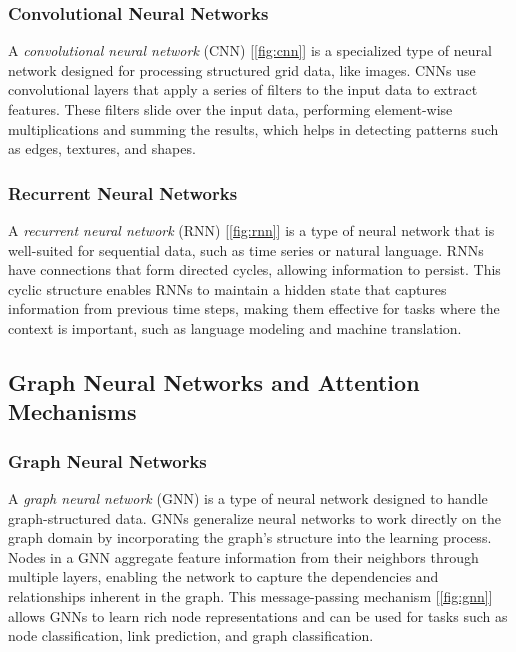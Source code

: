 \documentclass[../Thesis.tex]{subfiles}
\begin{document}
\subsubsection{Convolutional Neural Networks}
A \emph{convolutional neural network} (CNN) [\autoref{fig:cnn}] is a specialized type of neural network designed for processing structured grid data, like images. CNNs use convolutional layers that apply a series of filters to the input data to extract features. These filters slide over the input data, performing element-wise multiplications and summing the results, which helps in detecting patterns such as edges, textures, and shapes.


\subsubsection{Recurrent Neural Networks}
A \emph{recurrent neural network} (RNN) [\autoref{fig:rnn}] is a type of neural network that is well-suited for sequential data, such as time series or natural language. RNNs have connections that form directed cycles, allowing information to persist. This cyclic structure enables RNNs to maintain a hidden state that captures information from previous time steps, making them effective for tasks where the context is important, such as language modeling and machine translation.


\subsection{Graph Neural Networks and Attention Mechanisms}

\subsubsection{Graph Neural Networks}
A \emph{graph neural network} (GNN) is a type of neural network designed to handle graph-structured data. GNNs generalize neural networks to work directly on the graph domain by incorporating the graph's structure into the learning process. Nodes in a GNN aggregate feature information from their neighbors through multiple layers, enabling the network to capture the dependencies and relationships inherent in the graph. This message-passing mechanism [\autoref{fig:gnn}] allows GNNs to learn rich node representations and can be used for tasks such as node classification, link prediction, and graph classification. 

\end{document}
